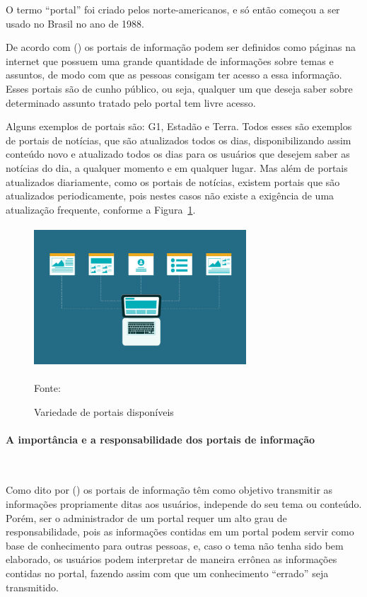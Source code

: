 O termo “portal” foi criado pelos norte-americanos, e só então começou a ser usado no Brasil no ano de 1988.

De acordo com (\cite{portais}) os portais de informação podem ser definidos como páginas na internet que possuem uma grande quantidade de informações sobre temas e assuntos, de modo com que as pessoas consigam ter acesso a essa informação. Esses portais são de cunho público, ou seja, qualquer um que deseja saber sobre determinado assunto tratado pelo portal tem livre acesso.

Alguns exemplos de portais são: G1, Estadão e Terra. Todos esses são exemplos de portais de notícias, que são atualizados todos os dias, disponibilizando assim conteúdo novo e atualizado todos os dias para os usuários que desejem saber as notícias do dia, a qualquer momento e em qualquer lugar.
\newpage
Mas além de portais atualizados diariamente, como os portais de notícias, existem portais que são atualizados periodicamente, pois nestes casos não existe a exigência de uma atualização frequente, conforme a Figura~\hypersetup{linkcolor=black}\ref{fig:Variedade}.

 \begin{figure}[!h]
	\centering
	\caption{Variedade de portais disponíveis}
	\label{fig:Variedade}
	\includegraphics[width=300px, height=200px]{./images/2-3.jpg}
		\par{Fonte: \cite{loba}}
\end{figure}

\paragraph{A importância e a responsabilidade dos portais de informação}\mbox{}\\
\par
Como dito por (\cite{portais}) os portais de informação têm como objetivo transmitir as informações propriamente ditas aos usuários, independe do seu tema ou conteúdo. Porém, ser o administrador de um portal requer um alto grau de responsabilidade, pois as informações contidas em um portal podem servir como base de conhecimento para outras pessoas, e, caso o tema não tenha sido bem elaborado, os usuários podem interpretar de maneira errônea as informações contidas no portal, fazendo assim com que um conhecimento “errado” seja transmitido.

